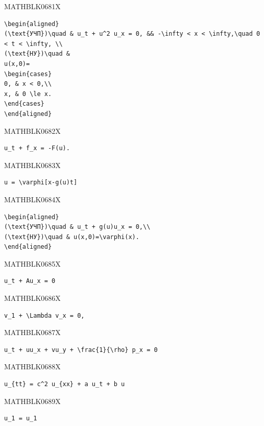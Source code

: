 \documentclass[
  ukrainian,
]{article}
\begin{document}
MATHBLK0681X

\begin{verbatim}
\begin{aligned}
(\text{УЧП})\quad & u_t + u^2 u_x = 0, && -\infty < x < \infty,\quad 0 < t < \infty, \\
(\text{НУ})\quad &
u(x,0)=
\begin{cases}
0, & x < 0,\\
x, & 0 \le x.
\end{cases}
\end{aligned}
\end{verbatim}

MATHBLK0682X

\begin{verbatim}
u_t + f_x = -F(u).
\end{verbatim}

MATHBLK0683X

\begin{verbatim}
u = \varphi[x-g(u)t]
\end{verbatim}

MATHBLK0684X

\begin{verbatim}
\begin{aligned}
(\text{УЧП})\quad & u_t + g(u)u_x = 0,\\
(\text{НУ})\quad & u(x,0)=\varphi(x).
\end{aligned}
\end{verbatim}

MATHBLK0685X

\begin{verbatim}
u_t + Au_x = 0
\end{verbatim}

MATHBLK0686X

\begin{verbatim}
v_1 + \Lambda v_x = 0,
\end{verbatim}

MATHBLK0687X

\begin{verbatim}
u_t + uu_x + vu_y + \frac{1}{\rho} p_x = 0
\end{verbatim}

MATHBLK0688X

\begin{verbatim}
u_{tt} = c^2 u_{xx} + a u_t + b u
\end{verbatim}

MATHBLK0689X

\begin{verbatim}
u_1 = u_1
\end{verbatim}
\end{document}
